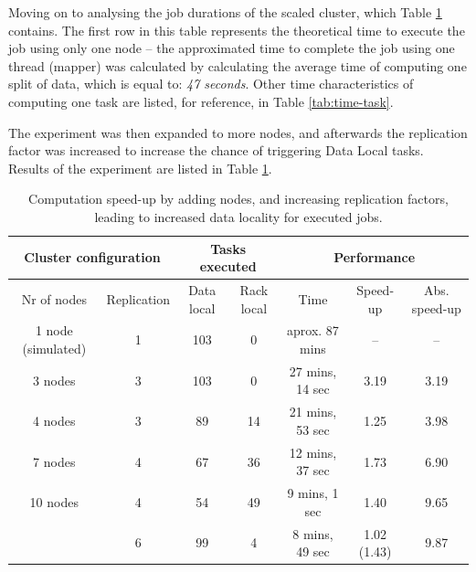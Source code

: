 Moving on to analysing the job durations of the scaled cluster, which Table \ref{tab:more-nodes-results} contains. The first row in this table represents the theoretical time to execute the job using only one node -- the approximated time to complete the job using one thread (mapper) was calculated by calculating the average time of computing one split of data, which is equal to: \textit{47 seconds}. Other time characteristics of computing one task are listed, for reference, in Table \ref{tab:time-task}.

The experiment was then expanded to more nodes, and afterwards the replication factor was increased to increase the chance of triggering Data Local tasks. Results of the experiment are listed in Table \ref{tab:more-nodes-results}.

\begin{table}[hbt]
  \centering
  \begin{tabular}{|c c|c|c|c|c|c|}
  \hline
    \multicolumn{2}{|c|}{\textbf{Cluster configuration}} & \multicolumn{2}{|c|}{\textbf{Tasks executed}} & \multicolumn{3}{|c|}{\textbf{Performance}} \\ \hline
    Nr of nodes & Replication & Data local & Rack local   & Time              & Speed-up    & Abs. speed-up \\ \hline
    1 node (simulated)    & 1 & 103 & 0                   & aprox. 87 mins    & --          & --            \\ \hline
    3 nodes               & 3 & 103 & 0                   & 27 mins, 14 sec   & 3.19        & 3.19          \\ \hline
    4 nodes               & 3 & 89  & 14                  & 21 mins, 53 sec   & 1.25        & 3.98          \\ \hline
    7 nodes               & 4 & 67  & 36                  & 12 mins, 37 sec   & 1.73        & 6.90          \\ \hline
    10 nodes              & 4 & 54  & 49                  & 9 mins, 1 sec     & 1.40        & 9.65          \\       
                          & 6 & 99  & 4                   & 8 mins, 49 sec    & 1.02 (1.43) & 9.87          \\ \hline
  \end{tabular}
  \caption{Computation speed-up by adding nodes, and increasing replication factors, leading to increased data locality for executed jobs.}
  \label{tab:more-nodes-results}
\end{table}

